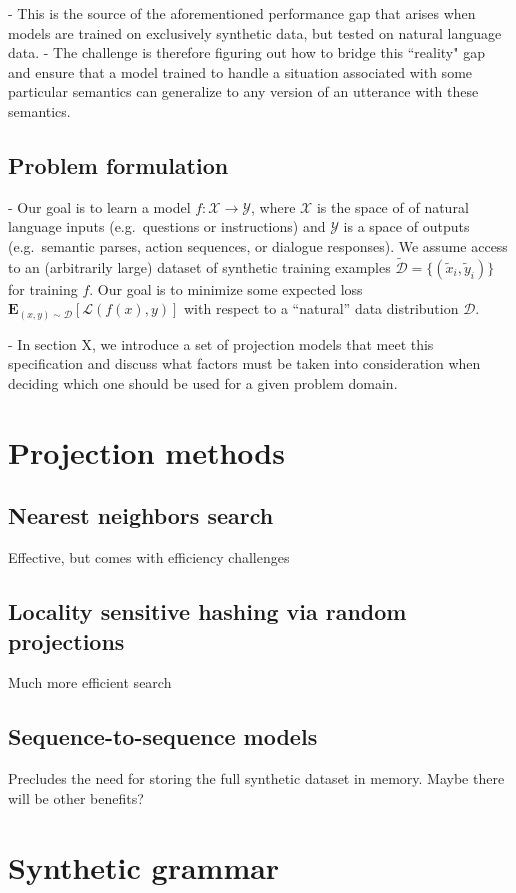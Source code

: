\documentclass{article}
\newcommand\model{f}
\newcommand\inputs{\mathcal{X}}
\newcommand\outputs{\mathcal{Y}}
\newcommand\fakedata{\tilde{\mathcal{D}}}
\newcommand\realdata{\mathcal{D}}
\newcommand\fakeinput{\tilde{x}}
\newcommand\fakeoutput{\tilde{y}}
\newcommand\realinput{x}
\newcommand\realoutput{y}
\newcommand\eg{e.g.\ }
\newcommand\expect{\mathbf{E}}
\newcommand\loss{\mathcal{L}}
\begin{document}
- This is the source of the aforementioned performance gap that arises when models are trained on exclusively synthetic data, but tested on natural language data. 
- The challenge is therefore figuring out how to bridge this ``reality" gap and ensure that a model trained to handle a situation associated with some particular semantics can generalize to any version of an utterance with these semantics. 

\subsection{Problem formulation}
- Our goal is to learn a model $\model : \inputs \to \outputs$, where $\inputs$ is the space of of natural language inputs (\eg questions or instructions) and $\outputs$ is a space of outputs (\eg semantic parses, action sequences, or dialogue responses). We assume access to an (arbitrarily large) dataset of synthetic training examples $\fakedata = \{(\fakeinput_i, \fakeoutput_i)\}$ for training $\model$. Our goal is to minimize some expected loss
$\expect_{(\realinput, \realoutput) \sim \realdata}[ \loss(\model(\realinput), \realoutput)]$
with respect to a ``natural'' data distribution $\realdata$.

- In section X, we introduce a set of projection models that meet this specification and discuss what factors must be taken into consideration when deciding which one should be used for a given problem domain. 

\section{Projection methods}
\subsection{Nearest neighbors search}
Effective, but comes with efficiency challenges
\subsection{Locality sensitive hashing via random projections}
Much more efficient search 
\subsection{Sequence-to-sequence models}
Precludes the need for storing the full synthetic dataset in memory. Maybe there will be other benefits?

\section{Synthetic grammar}
\end{document}
